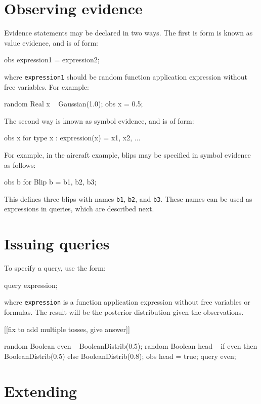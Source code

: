 \documentclass[12pt]{article}
\begin{document}
\section{Observing evidence}\label{evidence-section}
Evidence statements may be declared in two ways.  The first is form is known as value evidence, and is of form:
\begin{blogcode}
obs expression1 = expression2;
\end{blogcode}
where \texttt{expression1} should be random function application expression without free variables.  For example:
\begin{blogcode}
random Real x ~ Gaussian(1.0);
obs x = 0.5;
\end{blogcode}

The second way is known as symbol evidence, and is of form:
\begin{blogcode}
obs {x for type x : expression(x)} = { x1, x2, ...}
\end{blogcode}

For example, in the aircraft example, blips may be specified in symbol evidence as follows:
\begin{blogcode}
obs {b for Blip b} = {b1, b2, b3};
\end{blogcode}
This defines three blips with names \texttt{b1}, \texttt{b2}, and \texttt{b3}.  These names can be used as expressions in queries, which are described next.

\section{Issuing queries}\label{query-section}
To specify a query, use the form:
\begin{blogcode}
query expression;
\end{blogcode}
where \texttt{expression} is a function application expression without free variables or formulas. The result will be the posterior distribution given the observations. 

[[fix to add multiple tosses, give answer]]
\begin{blogcode}
random Boolean even ~ BooleanDistrib(0.5);
random Boolean head ~
  if even then BooleanDistrib(0.5)
  else BooleanDistrib(0.8);
obs head = true;
query even;
\end{blogcode}



\section{Extending \bl}\label{-section}
\end{document}
